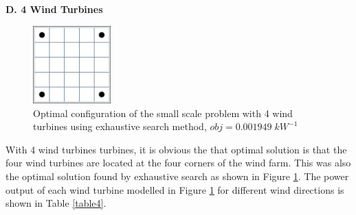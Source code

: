     \textbf{D. 4 Wind Turbines}
        \begin{figure}[H]
            \centering
            \includegraphics[width=3cm]{Figures/Chromosomes/4.png}
            \caption{Optimal configuration of the small scale problem with 4 wind turbines using exhaustive search method, $obj=0.001949\;kW^{-1}$}
            \label{small4}
        \end{figure}
        
        With 4 wind turbines turbines, it is obvious the that optimal solution is that the four wind turbines are located at the four corners of the wind farm. This was also the optimal solution found by exhaustive search as shown in Figure \ref{small4}. The power output of each wind turbine modelled in Figure \ref{small4} for different wind directions is shown in Table \ref{table4}.
        
